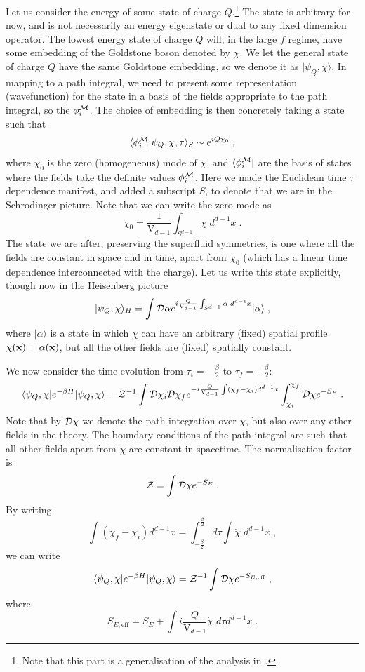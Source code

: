 \documentclass[11pt]{article}
\numberwithin{equation}{section}
\newcommand{\be}{\begin{equation}} \newcommand{\ee}{\end{equation}}
\begin{document}
Let us consider the energy of some state of charge $Q$.\footnote{Note that this part is a generalisation of the analysis in \cite{Badel:2019oxl}.} The state is arbitrary for now, and is not necessarily an energy eigenstate or dual to any fixed dimension operator. The lowest energy state of charge $Q$ will, in the large $f$ regime, have some embedding of the Goldstone boson denoted by $\chi$. We let the general state of charge $Q$ have the same Goldstone embedding, so we denote it as $|\psi_Q,\chi\rangle$. In mapping to a path integral, we need to present some representation (wavefunction) for the state in a basis of the fields appropriate to the path integral, so the $\phi^{\cal M}_i$. The choice of embedding is then concretely taking a state such that 
\be
\langle \phi^{\cal M}_i |\psi_Q,\chi,\tau\rangle_S \sim e^{i Q \chi_0} \;,
\label{defchemgl}
\ee 
where $\chi_0$ is the zero (homogeneous) mode of $\chi$, and $\langle \phi^{\cal M}_i|$ are the basis of states where the fields take the definite values $\phi^{\cal M}_i$. Here we made the Euclidean time $\tau$ dependence manifest, and added a subscript $S$, to denote that we are in the Schrodinger picture. Note that we can write the zero mode as
\be
\chi_0 = \frac{1}{\mathrm{V}_{d-1}}\int_{S^{d-1}} \chi \;d^{d-1}x\;.
\ee
The state we are after, preserving the superfluid symmetries, is one where all the fields are constant in space and in time, apart from $\chi_0$ (which has a linear time dependence interconnected with the charge). Let us write this state explicitly, though now in the Heisenberg picture \cite{Badel:2019oxl}
\be
|\psi_Q,\chi\rangle_H = \int {\cal D} \alpha e^{i \frac{Q}{\mathrm{V}_{d-1}} \int_{S^{d-1}} \alpha \;d^{d-1}x } | \alpha\rangle \;,
\label{wavefunchl}
\ee
where $| \alpha\rangle$ is a state in which $\chi$ can have an arbitrary (fixed) spatial profile $\chi({\bf x})=\alpha({\bf x})$, but all the other fields are (fixed) spatially constant. 

We now consider the time evolution from $\tau_i=-\frac{\beta}{2}$ to $\tau_f=+\frac{\beta}{2}$:
\be
\langle \psi_Q,\chi | e^{-\beta H } | \psi_Q,\chi  \rangle = {\cal Z}^{-1} \int {\cal D} \chi_i {\cal D} \chi_f e^{-i \frac{Q}{\mathrm{V}_{d-1}} \int \left( \chi_f - \chi_i \right) d^{d-1}x} \int_{\chi_i}^{\chi_f} {\cal D} \chi e^{-S_E} \;.
\label{qhqpi}
\ee
Note that by ${\cal D}\chi$ we denote the path integration over $\chi$, but also over any other fields in the theory. The boundary conditions of the path integral are such that all other fields apart from $\chi$ are constant in spacetime. 
The normalisation factor is
\be
{\cal Z} = \int {\cal D} \chi e^{-S_E} \;.
\ee
By writing
\be
\int \left( \chi_f - \chi_i \right) d^{d-1}x = \int_{-\frac{\beta}{2}}^{\frac{\beta}{2}} d\tau \int \dot{\chi} \; d^{d-1}x \;,
\ee
we can write 
\be
\langle \psi_Q,\chi | e^{-\beta H } | \psi_Q,\chi \rangle = {\cal Z}^{-1}\int {\cal D} \chi e^{-S_{E,\mathrm{eff}}} \;,
\label{wavefunchlshort}
\ee
where 
\be
S_{E,\mathrm{eff}} = S_E + \int i \frac{Q}{\mathrm{V}_{d-1}} \dot{\chi} \;d\tau d^{d-1}x  \;.
\label{effacbtr}
\ee
\end{document}
